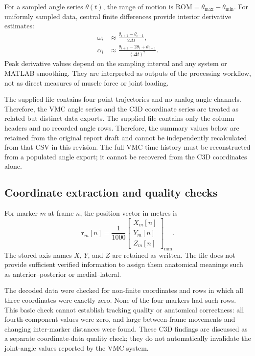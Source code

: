 \documentclass[12pt,a4paper]{article}
\newcommand{\file}[1]{\texttt{\detokenize{#1}}}
\begin{document}
For a sampled angle series $\theta(t)$, the range of motion is $\mathrm{ROM}=\theta_{\max}-\theta_{\min}$. For uniformly sampled data, central finite differences provide interior derivative estimates:
\begin{align}
\omega_i &\approx \frac{\theta_{i+1}-\theta_{i-1}}{2\Delta t},\\
\alpha_i &\approx \frac{\theta_{i+1}-2\theta_i+\theta_{i-1}}{(\Delta t)^2}.
\end{align}
Peak derivative values depend on the sampling interval and any system or MATLAB smoothing. They are interpreted as outputs of the processing workflow, not as direct measures of muscle force or joint loading.

The supplied \file{Motion2026.c3d} file contains four point trajectories and no analog angle channels. Therefore, the VMC angle series and the C3D coordinate series are treated as related but distinct data exports. The supplied file \file{VMC_joint_angles.csv} contains only the column headers and no recorded angle rows. Therefore, the summary values below are retained from the original report draft and cannot be independently recalculated from that CSV in this revision. The full VMC time history must be reconstructed from a populated angle export; it cannot be recovered from the C3D coordinates alone.

\subsection{Coordinate extraction and quality checks}

For marker $m$ at frame $n$, the position vector in metres is
\begin{equation}
\mathbf{r}_m[n] = \frac{1}{1000}
\begin{bmatrix}
X_m[n]\\Y_m[n]\\Z_m[n]
\end{bmatrix}_{\mathrm{mm}}.
\label{eq:units}
\end{equation}
The stored axis names $X$, $Y$, and $Z$ are retained as written. The file does not provide sufficient verified information to assign them anatomical meanings such as anterior--posterior or medial--lateral.

The decoded data were checked for non-finite coordinates and rows in which all three coordinates were exactly zero. None of the four markers had such rows. This basic check cannot establish tracking quality or anatomical correctness: all fourth-component values were zero, and large between-frame movements and changing inter-marker distances were found. These C3D findings are discussed as a separate coordinate-data quality check; they do not automatically invalidate the joint-angle values reported by the VMC system.
\end{document}
